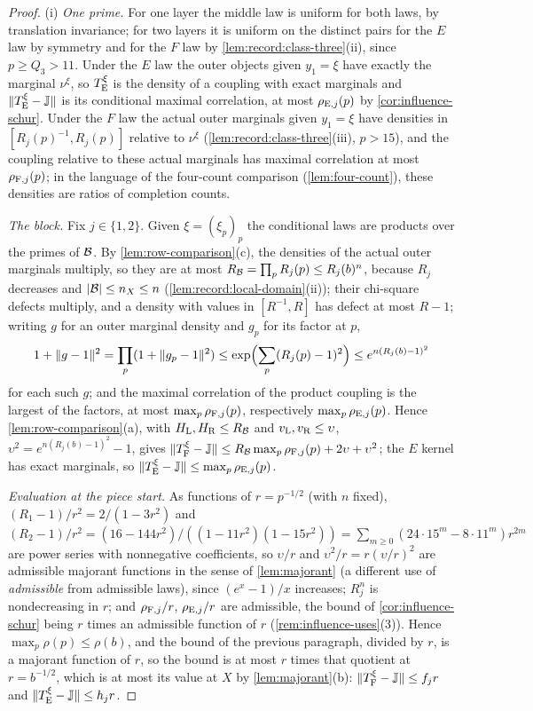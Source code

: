 \begin{proof}
(i) \emph{One prime.} For one layer the middle law is uniform for both laws,
by translation invariance; for two layers it is uniform on the distinct
pairs for the $E$ law by symmetry and for the $F$ law by
\cref{lem:record:class-three}(ii), since $p\ge Q_3>11$. Under the $E$ law the
outer objects given $y_1=\xi$ have exactly the marginal $\nu^\xi$, so
$T^\xi_{\rm E}$ is the density of a coupling with exact marginals and
$\|T^\xi_{\rm E}-\mathbb J\|$ is its conditional maximal correlation, at most
$\rho_{{\rm E},j}(p)$ by \cref{cor:influence-schur}. Under the $F$ law the
actual outer marginals given $y_1=\xi$ have densities in
$[R_j(p)^{-1},R_j(p)]$ relative to $\nu^\xi$ (\cref{lem:record:class-three}(iii),
$p>15$), and the coupling relative to these actual marginals has maximal
correlation at most $\rho_{{\rm F},j}(p)$; in the language of the four-count
comparison (\cref{lem:four-count}), these densities are ratios of completion
counts.

\emph{The block.} Fix $j\in\{1,2\}$. Given $\xi=(\xi_p)_p$ the conditional laws are products over
the primes of $\mathcal B$. By \cref{lem:row-comparison}(c), the densities of the
actual outer marginals multiply, so they are at most
$R_{\mathcal B}=\prod_pR_j(p)\le R_j(b)^n$, because $R_j$ decreases and
$|\mathcal B|\le n_X\le n$ (\cref{lem:record:local-domain}(ii)); their chi-square
defects multiply, and a density with values in $[R^{-1},R]$ has defect at
most $R-1$; writing $g$ for an outer marginal density and $g_p$ for its factor at $p$,
\[
 1+\|g-1\|^2=\prod_p(1+\|g_p-1\|^2)\le\exp\Bigl(\sum_p(R_j(p)-1)^2\Bigr)
 \le e^{n(R_j(b)-1)^2}
\]
for each such $g$; and the maximal correlation of the
product coupling is the largest of the factors, at most
$\max_p\rho_{{\rm F},j}(p)$, respectively $\max_p\rho_{{\rm E},j}(p)$. Hence
\cref{lem:row-comparison}(a), with $H_{\rm L},H_{\rm R}\le R_{\mathcal B}$ and
$v_{\rm L},v_{\rm R}\le\upsilon$, $\upsilon^2=e^{n(R_j(b)-1)^2}-1$, gives
$\|T^\xi_{\rm F}-\mathbb J\|\le R_{\mathcal B}\max_p\rho_{{\rm F},j}(p)+2\upsilon+\upsilon^2$;
the $E$ kernel has exact marginals, so
$\|T^\xi_{\rm E}-\mathbb J\|\le\max_p\rho_{{\rm E},j}(p)$.

\emph{Evaluation at the piece start.} As functions of $r=p^{-1/2}$ (with $n$
fixed), $(R_1-1)/r^2=2/(1-3r^2)$ and
$(R_2-1)/r^2=(16-144r^2)/((1-11r^2)(1-15r^2))
=\sum_{m\ge0}(24\cdot15^m-8\cdot11^m)r^{2m}$ are power series with
nonnegative coefficients, so $\upsilon/r$ and $\upsilon^2/r=r(\upsilon/r)^2$ are
admissible majorant functions in the sense of \cref{lem:majorant} (a different use of \emph{admissible} from admissible laws), since $(e^x-1)/x$ increases; $R_j^n$ is
nondecreasing in $r$; and $\rho_{{\rm F},j}/r$, $\rho_{{\rm E},j}/r$ are admissible,
the bound of \cref{cor:influence-schur} being $r$ times an admissible function
of $r$ (\cref{rem:influence-uses}(3)). Hence $\max_p\rho(p)\le\rho(b)$, and the bound
of the previous paragraph, divided by $r$, is a majorant function of $r$,
so the bound is at most $r$ times that quotient at $r=b^{-1/2}$, which is at most its value at $X$ by \cref{lem:majorant}(b):
$\|T^\xi_{\rm F}-\mathbb J\|\le f_jr$ and $\|T^\xi_{\rm E}-\mathbb J\|\le h_jr$.


\end{proof}

